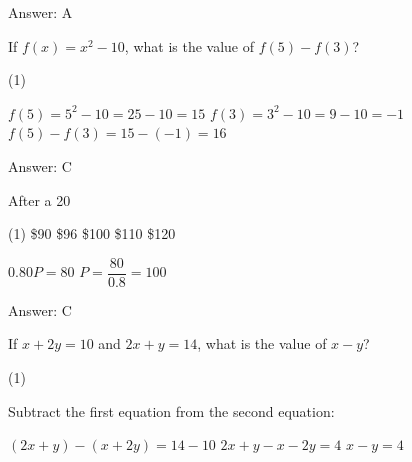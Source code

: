 \documentclass[11pt,paper=a4,answers]{exam}
\begin{document}
\begin{questions}
\begin{solution}
Answer: \colorbox{yellow!100}{A}
\end{solution}

\vspace{1cm}


\question
If $f(x) = x^2 - 10$, what is the value of $f(5) - f(3)$?

\begin{tasks}(1)
    
\end{tasks}

\begin{solution}
\begin{center}
$f(5) = 5^2 - 10 = 25 - 10 = 15$
\vspace{5pt}
$f(3) = 3^2 - 10 = 9 - 10 = -1$
\vspace{5pt}
$f(5) - f(3) = 15 - (-1) = 16$
\end{center}

Answer: \colorbox{yellow!100}{C}
\end{solution}

\vspace{1cm}

\question
After a 20%

\begin{tasks}(1)
\task[A)] \$90 \task[B)] \$96 \task[C)] \$100 \task[D)] \$110 \task[E)] \$120
\end{tasks}

\begin{solution}
\begin{center}
$0.80P = 80$
\vspace{5pt}
$P = \dfrac{80}{0.8} = 100$
\end{center}

Answer: \colorbox{yellow!100}{C}
\end{solution}

\vspace{1cm}

\question
If $x + 2y = 10$ and $2x + y = 14$, what is the value of $x - y$?

\begin{tasks}(1)
    
\end{tasks}

\begin{solution}
Subtract the first equation from the second equation:
\vspace{5pt}
\begin{center}
$(2x + y) - (x + 2y) = 14 - 10$
\vspace{5pt}
$2x + y - x - 2y = 4$
\vspace{5pt}
$x - y = 4$
\end{center}


\end{solution}
\end{questions}
\end{document}
